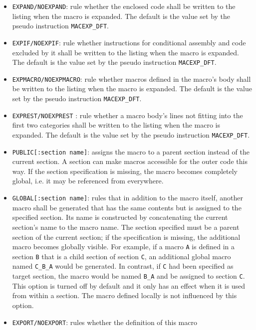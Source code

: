 \documentclass[12pt,twoside]{report}
\newcommand{\tty}[1]{{\tt #1}}
\begin{document}
\begin{itemize}
\item{\tty{EXPAND/NOEXPAND}: rule whether the enclosed code shall
      be written to the listing when the macro is expanded.  The
      default is the value set by the pseudo instruction
      \tty{MACEXP\_DFT}.}
\item{\tty{EXPIF/NOEXPIF}: rule whether instructions for
      conditional assembly and code excluded by it shall
      be written to the listing when the macro is expanded.  The
      default is the value set by the pseudo instruction
      \tty{MACEXP\_DFT}.}
\item{\tty{EXPMACRO/NOEXPMACRO}: rule whether macros defined in
      the macro's body shall be written to the listing when the macro
      is expanded.  The default is the value set by the pseudo instruction
      \tty{MACEXP\_DFT}.}
\item{\tty{EXPREST/NOEXPREST} : rule whether a macro body's lines
      not fitting into the first two categories shall be written to the
      listing when the macro is expanded. The default is the value set by
      the pseudo instruction \tty{MACEXP\_DFT}.}
\item{\tty{PUBLIC[:section name]}: assigns the macro to a parent section
      instead of the current section.  A section can make macros
      accessible for the outer code this way.  If the section
      specification is missing, the macro becomes completely global, i.e.
      it may be referenced from everywhere.}
\item{\tty{GLOBAL[:section name]}: rules that in addition to the macro
      itself, another macro shall be generated that has the same contents
      but is assigned to the specified section.  Its name is constructed by
      concatenating the current section's name to the macro name.  The
      section specified must be a parent section of the current section;
      if the specification is missing, the additional macro becomes
      globally visible.  For example, if a macro \tty{A} is defined in a
      section \tty{B} that is a child section of section \tty{C}, an additional
      global macro named \tty{C\_B\_A} would be generated.  In contrast, if
      \tty{C} had been specified as target section, the macro would be named \tty{B\_A}
      and be assigned to section \tty{C}.  This option is turned off by default
      and it only has an effect when it is used from within a section.
      The macro defined locally is not influenced by this option.}
\item{\tty{EXPORT/NOEXPORT}: rules whether the definition of this macro
}
\end{itemize}
\end{document}
